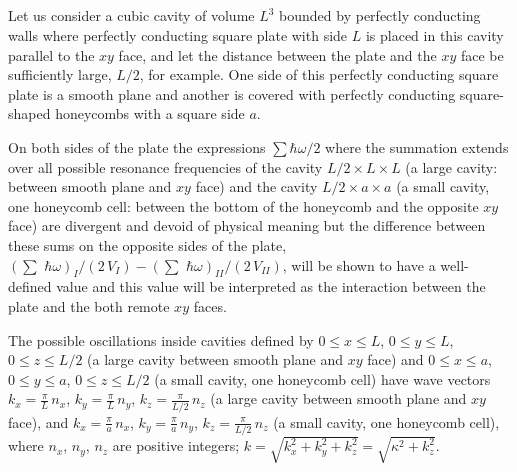 \documentclass[twoside, 10pt]{article}
\def\myvspacebeforesubsection{-2.0mm}
\def\myvspaceaftersubsection{-2.5mm}
\begin{document}
\begin{multicols}{2}
\vspace{\myvspacebeforesubsection}
    \subsection*{} \label{two-dimensional-casimirs-approach}
\vspace{\myvspaceaftersubsection}


    Let us consider a cubic cavity of volume \(L^3\) bounded by perfectly
conducting walls where perfectly conducting square plate with side
\(L\) is placed in this cavity parallel to the \(xy\) face, and let
the distance between the plate and the \(xy\) face be sufficiently large,
\(L/2\), for example.
One side of this perfectly conducting square plate is a smooth plane and
another is covered with perfectly conducting square-shaped honeycombs with
a square side \(a\).

On both sides of the plate the expressions \(\sum\hbar\omega\big/2\)
where the summation extends over all possible resonance frequencies of
the cavity \(L/2 \times L \times L\) (a large cavity: between smooth plane
and \(xy\) face) and the cavity \(L/2 \times a\times a\) (a small
cavity, one honeycomb cell: between the bottom of the honeycomb and the
opposite \(xy\) face) are divergent and devoid of physical meaning but
the difference between these sums on the opposite sides of the plate,
\(\left(\sum\,\,\hbar\omega\right)_{I}\big/{\left(2\,V_{I}\right)} - \left(\sum\,\,\hbar\omega\right)_{II}\big/{\left(2\,V_{II}\right)}\),
will be shown to have a well-defined value and this value will be
interpreted as the interaction between the plate and the both remote
\(xy\) faces.

    The possible oscillations inside cavities defined by
\(0 \leq x \leq L\), \(0 \leq y \leq L\), \(0 \leq z \leq L/2\) (a large cavity between smooth
plane and \(xy\) face) and
\(0 \leq x \leq a\), \(0 \leq y \leq a\), \(0 \leq z \leq L/2\) (a small cavity, one honeycomb
cell) have wave vectors
\(k_x = \frac{\pi}{L}\,n_x\), \(k_y = \frac{\pi}{L}\,n_y\),
\(k_z = \frac{\pi}{L/2}\,n_z\) (a large cavity between smooth plane and
\(xy\) face), and
\(k_x = \frac{\pi}{a}\,n_x\), \(k_y = \frac{\pi}{a}\,n_y\),
\(k_z = \frac{\pi}{L/2}\,n_z\) (a small cavity, one honeycomb cell),
where \(n_x\), \(n_y\), \(n_z\) are positive integers;
    \(k = \sqrt{k_x^2+k_y^2+k_z^2} = \sqrt{\kappa^2+k_z^2}\).


\end{multicols}
\end{document}
